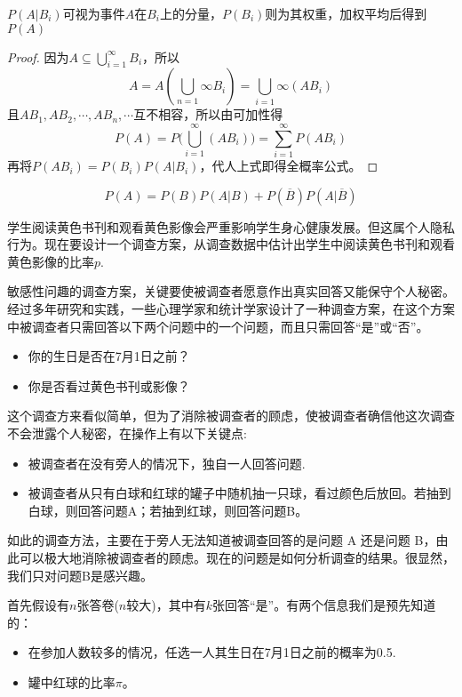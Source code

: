 \begin{note}
   $P(A | B_i)$可视为事件$A$在$B_i$上的分量，$P(B_i)$则为其权重，加权平均后得到$P(A)$
\end{note}

\begin{proof}
    因为$A \subseteq \bigcup_{i=1}^{\infty} B_i$，所以
    \[ A = A (\bigcup_{n=1}{\infty} B_i) = \bigcup_{i=1}{\infty} (A B_i) \]
    且$AB_1, AB_2, \cdots, AB_n, \cdots$互不相容，所以由可加性得
    \[ P(A) = P \biggl( \bigcup_{i=1}^{\infty} (AB_i) \biggr) = \sum_{i=1}^{\infty} P (AB_i) \]
    再将$P(AB_i) = P(B_i) P(A|B_i)$，代人上式即得全概率公式。
\end{proof}

\begin{corollary}
    \[ P(A) = P(B) P(A|B) + P(\overline{B}) P(A|\overline{B}) \]
\end{corollary}

\begin{example}[敏感性问题调查]
    学生阅读黄色书刊和观看黄色影像会严重影响学生身心健康发展。但这属个人隐私行为。现在要设计一个调查方案，从调查数据中估计出学生中阅读黄色书刊和观看黄色影像的比率$p$.
\end{example}

敏感性问趣的调查方案，关键要使被调查者愿意作出真实回答又能保守个人秘密。经过多年研究和实践，一些心理学家和统计学家设计了一种调查方案，在这个方案中被调查者只需回答以下两个问题中的一个问题，而且只需回答“是”或“否”。
\begin{itemize}
    \item 你的生日是否在7月1日之前？
    \item 你是否看过黄色书刊或影像？
\end{itemize}

这个调查方来看似简单，但为了消除被调查者的顾虑，使被调查者确信他这次调查不会泄露个人秘密，在操作上有以下关键点:
\begin{itemize}
    \item 被调查者在没有旁人的情况下，独自一人回答问题.
    \item 被调查者从只有白球和红球的罐子中随机抽一只球，看过颜色后放回。若抽到白球，则回答问题A；若抽到红球，则回答问题B。
\end{itemize}
如此的调查方法，主要在于旁人无法知道被调查回答的是问题 A 还是问题 B，由此可以极大地消除被调查者的顾虑。现在的问题是如何分析调查的结果。很显然，我们只对问题B是感兴趣。

首先假设有$n$张答卷($n$较大)，其中有$k$张回答“是”。有两个信息我们是预先知道的：
\begin{itemize}
    \item 在参加人数较多的情况，任选一人其生日在7月1日之前的概率为0.5.
    \item 罐中红球的比率$\pi$。
\end{itemize}

